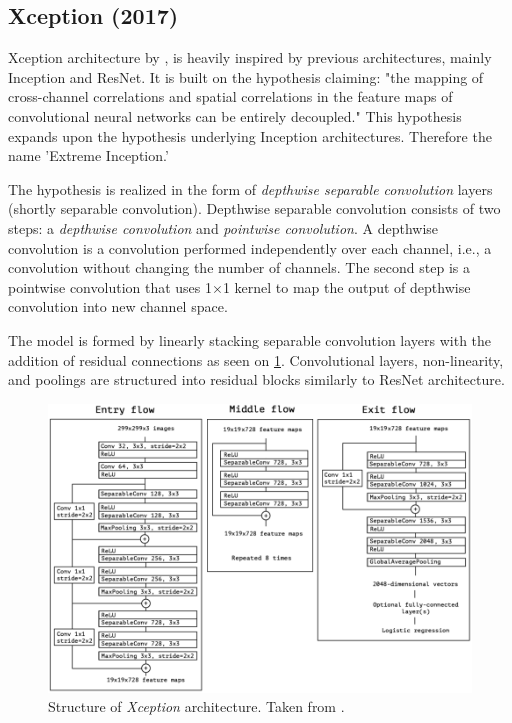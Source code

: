 \subsection{Xception (2017)}
\label{sec:xception} Xception architecture by \citeauthor{bib:xception} \cite{bib:xception}, is heavily inspired by previous architectures, mainly Inception and ResNet. It is built on the hypothesis claiming: "the mapping of cross-channel correlations and spatial correlations in the feature maps of convolutional neural networks can be entirely decoupled." This hypothesis expands upon the hypothesis underlying Inception architectures. Therefore the name 'Extreme Inception.' 

The hypothesis is realized in the form of \textit{depthwise separable convolution} layers (shortly separable convolution). Depthwise separable convolution consists of two steps: a \textit{depthwise convolution} and \textit{pointwise convolution}. A depthwise convolution is a convolution performed independently over each channel, i.e., a convolution without changing the number of channels. The second step is a pointwise convolution that uses 1$\times$1 kernel to map the output of depthwise convolution into new channel space.

The model is formed by linearly stacking separable convolution layers with the addition of residual connections as seen on \cref{fig:xception}. Convolutional layers, non-linearity, and poolings are structured into residual blocks similarly to ResNet architecture.

\begin{figure}
    \includegraphics[width=\textwidth]{img/xception}
    \caption[Xception architecture]%
    {Structure of \textit{Xception} architecture. Taken from \cite[fig. 5]{bib:xception}.}
    \label{fig:xception}
\end{figure}


